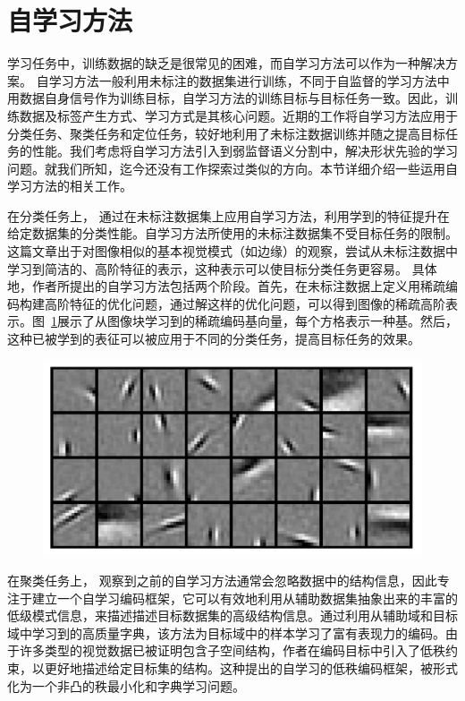 \section{自学习方法}
学习任务中，训练数据的缺乏是很常见的困难，而自学习方法可以作为一种解决方案。
自学习方法一般利用未标注的数据集进行训练，不同于自监督的学习方法中用数据自身信号作为训练目标，自学习方法的训练目标与目标任务一致。因此，训练数据及标签产生方式、学习方式是其核心问题。近期的工作将自学习方法应用于分类任务\citep{raina2007self,wang2013robust,feng2020autoencoder}、聚类任务\citep{li2017self,dai2008self,}和定位任务\citep{bazzani2016self,jie2017deep}，较好地利用了未标注数据训练并随之提高目标任务的性能。我们考虑将自学习方法引入到弱监督语义分割中，解决形状先验的学习问题。就我们所知，迄今还没有工作探索过类似的方向。本节详细介绍一些运用自学习方法的相关工作。

在分类任务上，\citet{raina2007self} 通过在未标注数据集上应用自学习方法，利用学到的特征提升在给定数据集的分类性能。自学习方法所使用的未标注数据集不受目标任务的限制。这篇文章出于对图像相似的基本视觉模式（如边缘）的观察，尝试从未标注数据中学习到简洁的、高阶特征的表示，这种表示可以使目标分类任务更容易。
具体地，作者所提出的自学习方法包括两个阶段。首先，在未标注数据上定义用稀疏编码构建高阶特征的优化问题，通过解这样的优化问题，可以得到图像的稀疏高阶表示。图~\ref{c2_fig7}展示了从图像块学习到的稀疏编码基向量，每个方格表示一种基。然后，这种已被学到的表征可以被应用于不同的分类任务，提高目标任务的效果。
    \begin{figure}[tbp]
        \centering 
        \includegraphics[width=1.0\textwidth]{img/c2/rel_b1.png}
        \label{c2_fig7}
    \end{figure}


在聚类任务上，\citet{li2017self} 观察到之前的自学习方法通常会忽略数据中的结构信息，因此专注于建立一个自学习编码框架，它可以有效地利用从辅助数据集抽象出来的丰富的低级模式信息，来描述描述目标数据集的高级结构信息。通过利用从辅助域和目标域中学习到的高质量字典，该方法为目标域中的样本学习了富有表现力的编码。由于许多类型的视觉数据已被证明包含子空间结构，作者在编码目标中引入了低秩约束，以更好地描述给定目标集的结构。这种提出的自学习的低秩编码框架，被形式化为一个非凸的秩最小化和字典学习问题。

